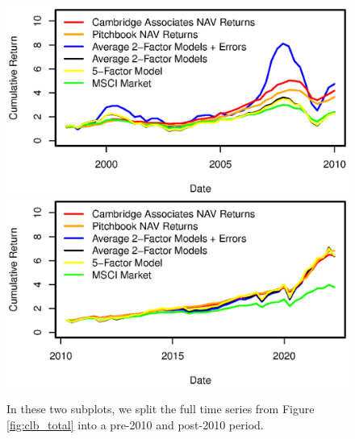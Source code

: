 \documentclass[12pt]{article}
\begin{document}
\begin{figure}[H]
	\centering
	\includegraphics{Figures/XTotalErrorSeriesBOpre2010}
	\includegraphics{Figures/XTotalErrorSeriesBOpost2010}
	\caption{
		In these two subplots, we split the full time series from Figure \ref{fig:clb_total} into a pre-2010 and post-2010 period.
	}
	\label{fig:clb_pre_post_2010}
\end{figure}
\end{document}
